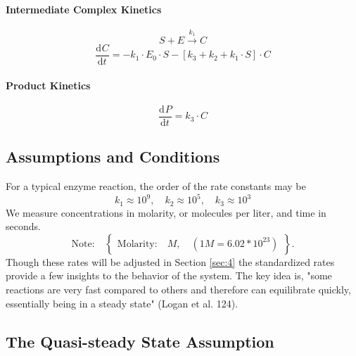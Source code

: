 \documentclass[smallextended]{svjour3}
\newcommand{\od}[3][]{\ensuremath{\frac{\mathrm{d}^{#1} {#2}}{\mathrm{d}{#3}^{#1}}}}
\newcommand{\ZeroNote}[1]{$$\text{Note:}\quad\left\{\begin{aligned} {#1} \end{aligned}\right\}.$$}
\begin{document}
\paragraph{Intermediate Complex Kinetics}
%
$$S + E \overset{k_1} \longrightarrow C$$
%
\begin{equation}
\label{eq:7}
\od{C}{t}= -k_1 \cdot E_0 \cdot S - {[k_3 +k_2 + k_1 \cdot S]} \cdot C 
\end{equation}
\paragraph{Product Kinetics}
%
$$\od{P}{t}= k_3 \cdot C $$
\subsection{Assumptions and Conditions}

For a typical enzyme reaction, the order of the rate constants may be
\begin{equation}
\label{eq:8}
k_1 \approx 10^9, \quad k_2 \approx 10^5, \quad k_3 \approx 10^3
\end{equation}
We measure concentrations in molarity, or molecules per liter, and time in seconds.          %
\ZeroNote{\text{Molarity:}\quad M, \quad {(1M = 6.02*10^23)}}        %
%
\quad Though these rates will be adjusted in Section \ref{sec:4} the standardized rates provide a few insights to the behavior of the system. The key idea is, "some reactions are very fast compared to others and therefore can equilibrate quickly, essentially being in a steady state" \cite{Ref28} {(Logan et al. 124)}.

\subsection{The Quasi-steady State Assumption}
\end{document}
